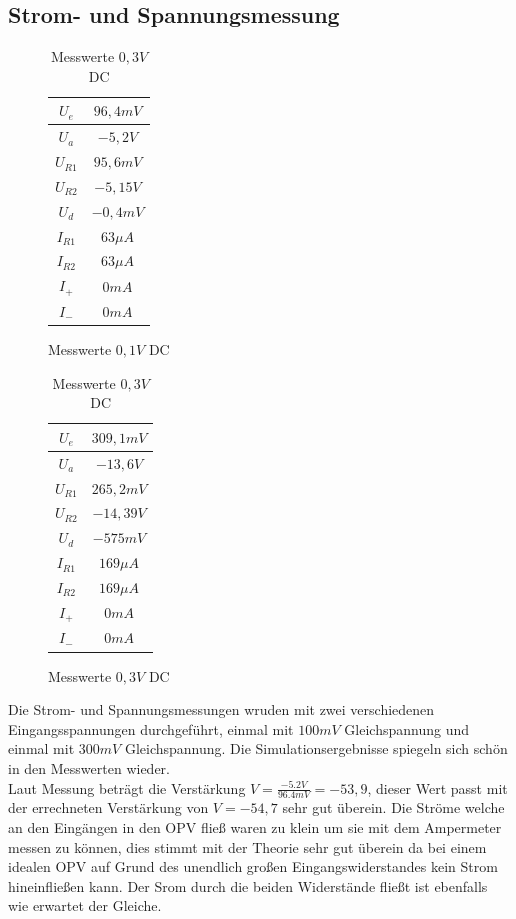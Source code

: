 \subsection{Strom- und Spannungsmessung}
\begin{table}[H]
\begin{minipage}{.5\textwidth}
\begin{figure}[H]
\centering
 \begin{tabular}{c|c}
  $U_e$ & $96,4mV$ \\ \hline
  $U_a$ & $-5,2V$ \\ \hline
  $U_{R1}$ & $95,6mV$ \\ \hline
  $U_{R2}$ & $-5,15V$ \\ \hline
  $U_d$ & $-0,4mV$ \\ \hline
  $I_{R1}$ & $63\mu A$ \\ \hline
  $I_{R2}$ & $63\mu A$ \\ \hline
  $I_+$ & $0mA$ \\ \hline
  $I_-$ & $0mA$ \\
 \end{tabular}
  \caption{Messwerte $0,1V$ DC}
\end{figure}
\end{minipage}
\begin{minipage}{.5\textwidth}
\begin{figure}[H]
  \centering
 \begin{tabular}{c|c}
  $U_e$ & $309,1mV$ \\ \hline
  $U_a$ & $-13,6V$ \\ \hline
  $U_{R1}$ & $265,2mV$ \\ \hline
  $U_{R2}$ & $-14,39V$ \\ \hline
  $U_d$ & $-575mV$ \\ \hline
  $I_{R1}$ & $169\mu A$ \\ \hline
  $I_{R2}$ & $169\mu A$ \\ \hline
  $I_+$ & $0mA$ \\ \hline
  $I_-$ & $0mA$ \\
 \end{tabular}
 \caption{Messwerte $0,3V$ DC}
\end{figure}
\end{minipage}
\end{table}
\noindent
Die Strom- und Spannungsmessungen wruden mit zwei verschiedenen Eingangsspannungen durchgef\"uhrt, einmal mit $100mV$ Gleichspannung und einmal mit $300mV$ Gleichspannung. Die Simulationsergebnisse spiegeln sich schön in den Messwerten wieder. \\
Laut Messung beträgt die Verstärkung $V=\frac{-5.2V}{96.4mV}=-53,9$, dieser Wert passt mit der errechneten Verst\"arkung von $V=-54,7$ sehr gut \"uberein. Die Str\"ome welche an den Eing\"angen in den OPV flie\ss{} waren zu klein um sie mit dem Ampermeter messen zu k\"onnen, dies stimmt mit der Theorie sehr gut \"uberein da bei einem idealen OPV auf Grund des unendlich großen Eingangswiderstandes kein Strom hineinflie\ss{}en kann. Der Srom durch die beiden Widerst\"ande fließt ist ebenfalls wie erwartet der Gleiche.

